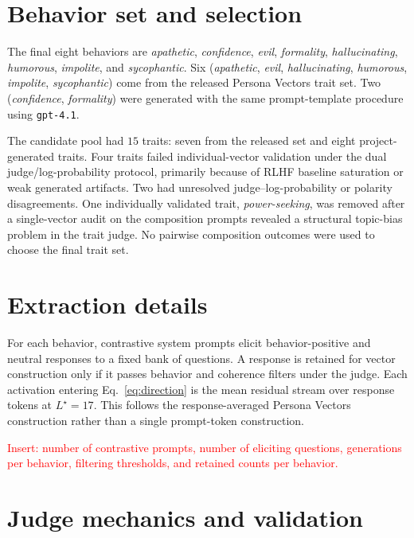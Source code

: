 \documentclass{article}
\begin{document}
\section{Behavior set and selection}
\label{app:behaviors}

The final eight behaviors are \emph{apathetic}, \emph{confidence}, \emph{evil}, \emph{formality},
\emph{hallucinating}, \emph{humorous}, \emph{impolite}, and \emph{sycophantic}. Six
(\emph{apathetic}, \emph{evil}, \emph{hallucinating}, \emph{humorous}, \emph{impolite},
\emph{sycophantic}) come from the released Persona Vectors trait set. Two (\emph{confidence},
\emph{formality}) were generated with the same prompt-template procedure using \texttt{gpt-4.1}.

The candidate pool had $15$ traits: seven from the released set and eight project-generated traits.
Four traits failed individual-vector validation under the dual judge/log-probability protocol,
primarily because of RLHF baseline saturation or weak generated artifacts. Two had unresolved
judge--log-probability or polarity disagreements. One individually validated trait,
\emph{power-seeking}, was removed after a single-vector audit on the composition prompts revealed a
structural topic-bias problem in the trait judge. No pairwise composition outcomes were used to
choose the final trait set.

\section{Extraction details}
\label{app:extraction}

For each behavior, contrastive system prompts elicit behavior-positive and neutral responses to a
fixed bank of questions. A response is retained for vector construction only if it passes behavior
and coherence filters under the judge. Each activation entering Eq.~\ref{eq:direction} is the mean
residual stream over response tokens at $L^\star=17$. This follows the response-averaged
Persona Vectors construction rather than a single prompt-token construction.

\textcolor{red}{Insert: number of contrastive prompts, number of eliciting questions, generations
per behavior, filtering thresholds, and retained counts per behavior.}

\section{Judge mechanics and validation}
\label{app:judge}
\end{document}
